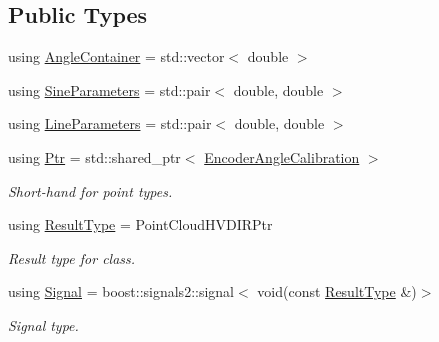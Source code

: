 \subsection*{Public Types}
\begin{DoxyCompactItemize}
\item 
using \hyperlink{structquanergy_1_1calibration_1_1EncoderAngleCalibration_ad2e08ae4ae94662029c907d43c5f879c}{Angle\-Container} = std\-::vector$<$ double $>$
\item 
using \hyperlink{structquanergy_1_1calibration_1_1EncoderAngleCalibration_a989e77cbef9730169908a437323a96c2}{Sine\-Parameters} = std\-::pair$<$ double, double $>$
\item 
using \hyperlink{structquanergy_1_1calibration_1_1EncoderAngleCalibration_aa41576cd5cbf0b1d917a9a781be9e308}{Line\-Parameters} = std\-::pair$<$ double, double $>$
\item 
\hypertarget{structquanergy_1_1calibration_1_1EncoderAngleCalibration_ae50457c8a6ce95e6c44c3aa32659ee40}{using \hyperlink{structquanergy_1_1calibration_1_1EncoderAngleCalibration_ae50457c8a6ce95e6c44c3aa32659ee40}{Ptr} = std\-::shared\-\_\-ptr$<$ \hyperlink{structquanergy_1_1calibration_1_1EncoderAngleCalibration}{Encoder\-Angle\-Calibration} $>$}\label{structquanergy_1_1calibration_1_1EncoderAngleCalibration_ae50457c8a6ce95e6c44c3aa32659ee40}

\begin{DoxyCompactList}\small\item\em Short-\/hand for point types. \end{DoxyCompactList}\item 
\hypertarget{structquanergy_1_1calibration_1_1EncoderAngleCalibration_a32f20fa67f6d6bff7b21b76f695489f7}{using \hyperlink{structquanergy_1_1calibration_1_1EncoderAngleCalibration_a32f20fa67f6d6bff7b21b76f695489f7}{Result\-Type} = Point\-Cloud\-H\-V\-D\-I\-R\-Ptr}\label{structquanergy_1_1calibration_1_1EncoderAngleCalibration_a32f20fa67f6d6bff7b21b76f695489f7}

\begin{DoxyCompactList}\small\item\em Result type for class. \end{DoxyCompactList}\item 
\hypertarget{structquanergy_1_1calibration_1_1EncoderAngleCalibration_aeb5bc875838932085c43143e44a2942a}{using \hyperlink{structquanergy_1_1calibration_1_1EncoderAngleCalibration_aeb5bc875838932085c43143e44a2942a}{Signal} = boost\-::signals2\-::signal$<$ void(const \hyperlink{structquanergy_1_1calibration_1_1EncoderAngleCalibration_a32f20fa67f6d6bff7b21b76f695489f7}{Result\-Type} \&)$>$}\label{structquanergy_1_1calibration_1_1EncoderAngleCalibration_aeb5bc875838932085c43143e44a2942a}

\begin{DoxyCompactList}\small\item\em Signal type. \end{DoxyCompactList}\end{DoxyCompactItemize}
